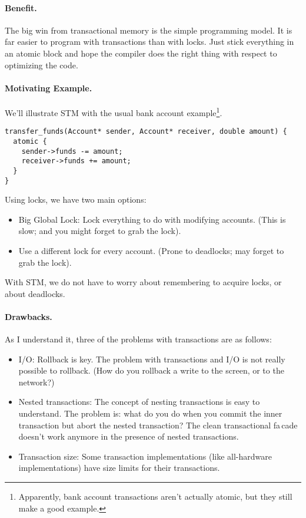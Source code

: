 \paragraph{Benefit.} The big win from transactional memory is the simple
programming model. It is far easier to program with transactions than with
locks. Just stick everything in an atomic block and hope the compiler does the
right thing with respect to optimizing the code.

\paragraph{Motivating Example.} We'll illustrate STM with the usual bank account example\footnote{Apparently, bank account transactions aren't actually atomic, but they still make a good example.}.
  \begin{lstlisting}
transfer_funds(Account* sender, Account* receiver, double amount) {
  atomic {
    sender->funds -= amount;
    receiver->funds += amount;
  }
}
  \end{lstlisting}

Using locks, we have two main options:
      \begin{itemize}
        \item Big Global Lock: Lock everything to do with modifying accounts. (This is slow; and you might forget to grab the lock).
        \item Use a different lock for every account. (Prone to deadlocks; may forget to grab the lock).
      \end{itemize}
With STM, we do not have to worry about remembering to acquire locks,
or about deadlocks.

\paragraph{Drawbacks.} As I understand it, three of the problems with 
transactions are as follows:

\begin{itemize}
\item I/O: Rollback is key. The problem with transactions and I/O is
  not really possible to rollback. (How do you rollback a write to the
  screen, or to the network?)

\item Nested transactions: The concept of nesting transactions is easy
  to understand. The problem is: what do you do when you commit the
  inner transaction but abort the nested transaction? The clean
  transactional fa\,cade doesn't work anymore in the presence of
  nested transactions.

\item Transaction size: Some transaction implementations (like
  all-hardware implementations) have size limits for their
  transactions.
\end{itemize}

